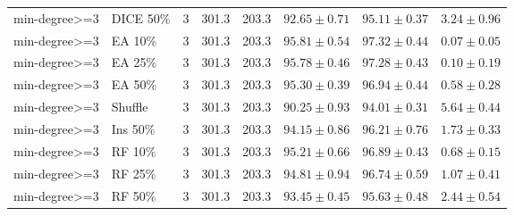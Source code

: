 {\begin{longtable}{llrrrrrr}
min-degree>=3 & DICE 50\% & 3 & 301.3 & 203.3 & $92.65\pm0.71$ & $95.11\pm0.37$ & $3.24\pm0.96$ \\
min-degree>=3 & EA 10\% & 3 & 301.3 & 203.3 & $95.81\pm0.54$ & $97.32\pm0.44$ & $0.07\pm0.05$ \\
min-degree>=3 & EA 25\% & 3 & 301.3 & 203.3 & $95.78\pm0.46$ & $97.28\pm0.43$ & $0.10\pm0.19$ \\
min-degree>=3 & EA 50\% & 3 & 301.3 & 203.3 & $95.30\pm0.39$ & $96.94\pm0.44$ & $0.58\pm0.28$ \\
min-degree>=3 & Shuffle & 3 & 301.3 & 203.3 & $90.25\pm0.93$ & $94.01\pm0.31$ & $5.64\pm0.44$ \\
min-degree>=3 & Ins 50\% & 3 & 301.3 & 203.3 & $94.15\pm0.86$ & $96.21\pm0.76$ & $1.73\pm0.33$ \\
min-degree>=3 & RF 10\% & 3 & 301.3 & 203.3 & $95.21\pm0.66$ & $96.89\pm0.43$ & $0.68\pm0.15$ \\
min-degree>=3 & RF 25\% & 3 & 301.3 & 203.3 & $94.81\pm0.94$ & $96.74\pm0.59$ & $1.07\pm0.41$ \\
min-degree>=3 & RF 50\% & 3 & 301.3 & 203.3 & $93.45\pm0.45$ & $95.63\pm0.48$ & $2.44\pm0.54$ \\
\end{longtable}
}

